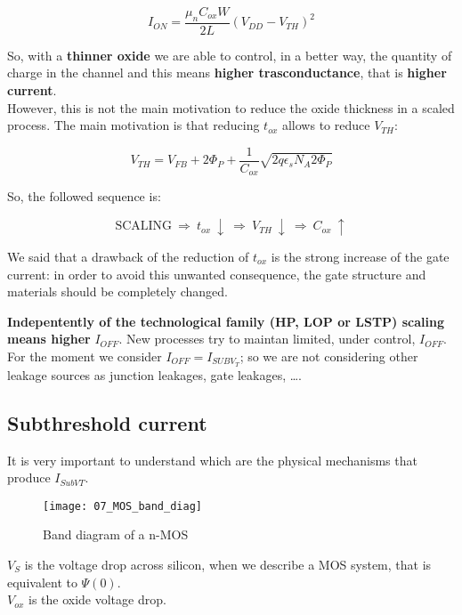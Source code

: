 \documentclass[a4paper, 12pt, twoside, openright]{report}
\begin{document}
\begin{equation}
I_{ON} = \frac{\mu_n C_{ox} W}{2 L} (V_{DD} - V_{TH})^2
\label{}
\end{equation}

So, with a \textbf{thinner oxide} we are able to control, in a better way, the quantity of charge in the channel and this means \textbf{higher trasconductance}, that is \textbf{higher current}.\\
However, this is not the main motivation to reduce the oxide thickness in a scaled process. The main motivation is that reducing $t_{ox}$ allows to reduce $V_{TH}$:

\begin{equation}
V_{TH} = V_{FB} + 2 \Phi_{P} + \frac{1}{C_{ox}} \sqrt{2 q \epsilon_s N_A 2 \Phi_{P}}
\label{V_th}
\end{equation}

So, the followed sequence is:

\begin{equation}
\text{SCALING} \ \Rightarrow \ t_{ox} \ \downarrow \ \Rightarrow \ V_{TH} \ \downarrow \ \Rightarrow \ C_{ox} \ \uparrow
\end{equation}

We said that a drawback of the reduction of $t_{ox}$ is the strong increase of the gate current: in order to avoid this unwanted consequence, the gate structure and materials should be completely changed.

\textbf{Indepentently of the technological family (HP, LOP or LSTP) scaling means higher} $I_{OFF}$. New processes try to maintan limited, under control, $I_{OFF}$. For the moment we consider $I_{OFF} = I_{SUBV_{T}}$; so we are not considering other leakage sources as junction leakages, gate leakages, \dots.

\subsection{Subthreshold current}

It is very important to understand which are the physical mechanisms that produce $I_{SubVT}$.

	\begin{figure}[H]
	\centering
	\texttt{[image: 07\_MOS\_band\_diag]}
	\caption{Band diagram of a n-MOS}
	\label{}
	\end{figure}

$V_{S}$ is the voltage drop across silicon, when we describe a MOS system, that is equivalent to $\Psi(0)$.\\
$V_{ox}$ is the oxide voltage drop.
\end{document}
